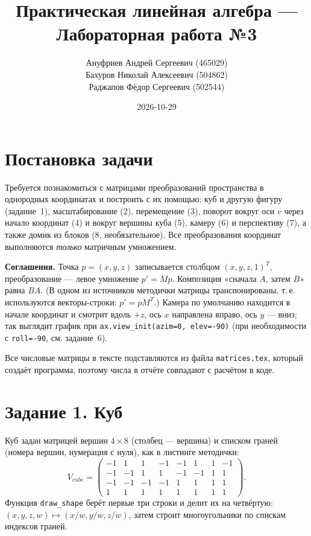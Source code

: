 \documentclass[a4paper, 12pt]{article}
\title{
    Практическая линейная алгебра — Лабораторная работа №3
}
\author{%
    Ануфриев Андрей Сергеевич (465029)\\
    Бахуров Николай Алексеевич (504862)\\
    Раджапов Фёдор Сергеевич (502544)%
}
\date{2026-10-29}
\begin{document}
    \maketitle
    \tableofcontents
    \newpage

    \section{Постановка задачи}
    Требуется познакомиться с матрицами преобразований пространства в однородных координатах и построить с их помощью: куб и другую фигуру (задание~1), масштабирование (2), перемещение (3), поворот вокруг оси $v$ через начало координат (4) и вокруг вершины куба (5), камеру (6) и перспективу (7), а также домик из блоков (8, необязательное). Все преобразования координат выполняются \emph{только} матричным умножением.

    \textbf{Соглашения.} Точка $p=(x,y,z)$ записывается столбцом $(x,y,z,1)^T$, преобразование --- левое умножение $p'=Mp$. Композиция «сначала $A$, затем $B$» равна $BA$. (В одном из источников методички матрицы транспонированы, т.\,е. используются векторы-строки: $p'=pM^T$.) Камера по умолчанию находится в начале координат и смотрит вдоль $+z$, ось $x$ направлена вправо, ось $y$ --- вниз; так выглядит график при \texttt{ax.view\_init(azim=0, elev=-90)} (при необходимости с \texttt{roll=-90}, см. задание~6).

    Все числовые матрицы в тексте подставляются из файла \texttt{matrices.tex}, который создаёт программа, поэтому числа в отчёте совпадают с расчётом в коде.

    \section{Задание 1. Куб}
    Куб задан матрицей вершин $4\times8$ (столбец --- вершина) и списком граней (номера вершин, нумерация с нуля), как в листинге методички:
    $$V_{cube}=\begin{pmatrix}-1&1&1&-1&-1&1&1&-1\\-1&-1&1&1&-1&-1&1&1\\-1&-1&-1&-1&1&1&1&1\\1&1&1&1&1&1&1&1\end{pmatrix}.$$
    Функция \texttt{draw\_shape} берёт первые три строки и делит их на четвёртую: $(x,y,z,w)\mapsto(x/w,y/w,z/w)$, затем строит многоугольники по спискам индексов граней.
\end{document}
